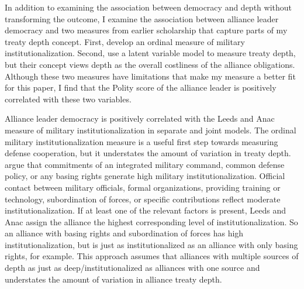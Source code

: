 \documentclass[12pt]{article}
\begin{document}
In addition to examining the association between democracy and depth without transforming the outcome, I examine the association between alliance leader democracy and two measures from earlier scholarship that capture parts of my treaty depth concept. 
First, \citet{LeedsAnac2005} develop an ordinal measure of military institutionalization.
Second, \citet{BensonClinton2016} use a latent variable model to measure treaty depth, but their concept views depth as the overall costliness of the alliance obligations. 
Although these two measures have limitations that make my measure a better fit for this paper, I find that the Polity score of the alliance leader is positively correlated with these two variables.


Alliance leader democracy is positively correlated with the Leeds and Anac measure of military institutionalization in separate and joint models.
The ordinal military institutionalization measure is a useful first step towards measuring defense cooperation, but it understates the amount of variation in treaty depth. 
\citet{LeedsAnac2005} argue that commitments of an integrated military command, common defense policy, or any basing rights generate high military institutionalization. 
Official contact between military officials, formal organizations, providing training or technology, subordination of forces, or specific contributions reflect moderate institutionalization. 
If at least one of the relevant factors is present, Leeds and Anac assign the alliance the highest corresponding level of institutionalization. 
So an alliance with basing rights and subordination of forces has high institutionalization, but is just as institutionalized as an alliance with only basing rights, for example. 
This approach assumes that alliances with multiple sources of depth as just as deep/institutionalized as alliances with one source and understates the amount of variation in alliance treaty depth.
\end{document}
